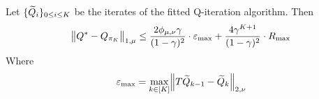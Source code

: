 
\begin{thm}\label{thm:errorprop}
	Let $\{\widetilde{Q}_i\}_{0\leq i\leq K}$ be the iterates of the fitted Q-iteration algorithm.
	Then
	\begin{equation*}
	  \norm{Q^* - Q_{\pi_K}}_{1, \mu}
	  \leq \frac{2 \phi_{\mu,\nu} \gamma}{(1-\gamma)^2} \cdot \varepsilon_{\max}
	  + \frac{4 \gamma^{K+1}}{(1-\gamma)^2} \cdot R_{\max}
	\end{equation*}
	Where
	\[ \varepsilon_{\max}
	= \max_{k \in [K]} \norm{T\widetilde{Q}_{k-1} - \widetilde{Q}_k}_{2,\nu} \] 
\end{thm}
